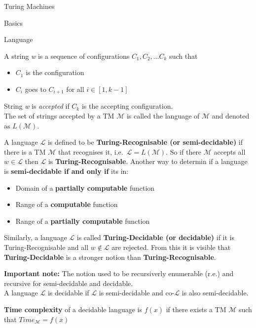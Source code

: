 \documentclass[12pt, letterpaper]{article}
\begin{document}
\begin{section}{Turing Machines}
\begin{subsection}{Basics}
  \end{subsection}

  \begin{subsection}{Language}

    A string \textit{w} is a sequence of configurations \(C_{1}, C_{2}, \dots C_{k}\) such that
    \begin{itemize}
      \item \(C_{1}\) is the configuration
      \item \(C_{i}\) goes to \(C_{i+1}\) for all \(i \in [1, k - 1]\)
    \end{itemize}
    String \textit{w} is \emph{accepted} if \(C_{k}\) is the accepting configuration. \\
    The set of strings accepted by a TM \(\mathscr{M}\) is called the language of \(\mathscr{M}\)
    and denoted as \(L(\mathscr{M})\).

    A language \(\mathscr{L}\) is defined to be \textbf{Turing-Recognisable (or semi-decidable)}
    if there is a TM \(\mathscr{M}\) that recognises it, i.e.\ \(\mathscr{L} = L(\mathscr{M})\).
    So if there \(\mathscr{M}\) accepts all \(\textit{w} \in \mathscr{L}\) then \(\mathscr{L}\)
    is \textbf{Turing-Recognisable}.
    Another way to determin if a language is \textbf{semi-decidable if and only if} its in:
    \begin{itemize}
      \item Domain of a \textbf{partially computable} function
      \item Range of a \textbf{computable} function
      \item Range of a \textbf{partially computable} function
    \end{itemize}

    Similarly, a language \(\mathscr{L}\) is called \textbf{Turing-Decidable (or decidable)}
    if it is Turing-Recognisable and all \(\textit{w} \notin \mathscr{L}\) are rejected.
    From this it is visible that \textbf{Turing-Decidable} is a stronger notion than
    \textbf{Turing-Recognisable}.

    \textbf{Important note:} The notion used to be recursiverly enumerable (r.e.)
    and recursive for semi-decidable and decidable. \\
    A language \(\mathscr{L}\) is decidable if \(\mathscr{L}\) is semi-decidable
    and co-\(\mathscr{L}\) is also semi-decidable.

    \textbf{Time complexity} of a decidable language is \(f(x)\) if there exists
    a TM \(\mathscr{M}\) such that \(Time_{\mathscr{M}} = f(x)\)


\end{subsection}
\end{section}
\end{document}
